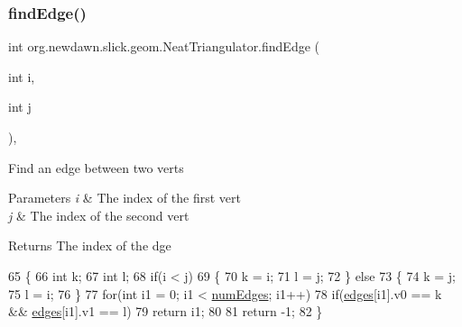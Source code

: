 \subsubsection{\texorpdfstring{find\+Edge()}{findEdge()}}
{\footnotesize\ttfamily int org.\+newdawn.\+slick.\+geom.\+Neat\+Triangulator.\+find\+Edge (\begin{DoxyParamCaption}\item[{int}]{i,  }\item[{int}]{j }\end{DoxyParamCaption})\hspace{0.3cm}{\ttfamily [inline]}, {\ttfamily [private]}}

Find an edge between two verts


\begin{DoxyParams}{Parameters}
{\em i} & The index of the first vert \\
\hline
{\em j} & The index of the second vert \\
\hline
\end{DoxyParams}
\begin{DoxyReturn}{Returns}
The index of the dge 
\end{DoxyReturn}

\begin{DoxyCode}
65     \{
66         \textcolor{keywordtype}{int} k;
67         \textcolor{keywordtype}{int} l;
68         \textcolor{keywordflow}{if}(i < j)
69         \{
70             k = i;
71             l = j;
72         \} \textcolor{keywordflow}{else}
73         \{
74             k = j;
75             l = i;
76         \}
77         \textcolor{keywordflow}{for}(\textcolor{keywordtype}{int} i1 = 0; i1 < \mbox{\hyperlink{classorg_1_1newdawn_1_1slick_1_1geom_1_1_neat_triangulator_a4c9fba4faad072774b3b0fcbc7fd0fff}{numEdges}}; i1++)
78             \textcolor{keywordflow}{if}(\mbox{\hyperlink{classorg_1_1newdawn_1_1slick_1_1geom_1_1_neat_triangulator_a0abf260e1febb5ef0afc9894280f9efb}{edges}}[i1].v0 == k && \mbox{\hyperlink{classorg_1_1newdawn_1_1slick_1_1geom_1_1_neat_triangulator_a0abf260e1febb5ef0afc9894280f9efb}{edges}}[i1].v1 == l)
79                 \textcolor{keywordflow}{return} i1;
80 
81         \textcolor{keywordflow}{return} -1;
82     \}
\end{DoxyCode}
\mbox{\label{classorg_1_1newdawn_1_1slick_1_1geom_1_1_neat_triangulator_a9974151d5e703dc37326ac89f8db1de1}} 
